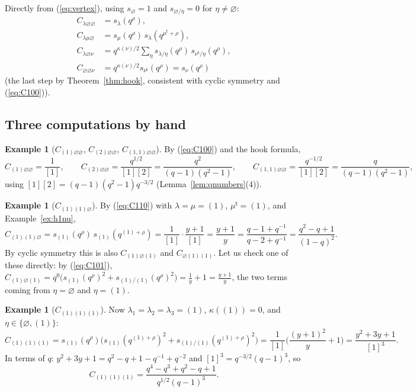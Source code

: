 \documentclass[11pt]{article}
\theoremstyle{plain}
\theoremstyle{definition}
\newtheorem{example}[theorem]{Example}
\theoremstyle{remark}
\newcommand{\qrho}{q^{\rho}}
\newcommand{\qlr}[1]{q^{#1+\rho}}
\newcommand{\es}{\varnothing}
\newcommand{\tr}{{\mathsf t}}
\newcommand{\lt}[1]{#1^{\tr}}
\begin{document}
Directly from (\ref{eq:vertex}), using $s_{\es}=1$ and $s_{\es/\eta}=0$ for $\eta\ne\es$:
\begin{align}
C_{\lambda\es\es}&=s_\lambda(\qrho),\label{eq:C100}\\
C_{\lambda\mu\es}&=s_\mu(\qrho)\,s_\lambda(q^{\lt\mu+\rho}),\label{eq:C110}\\
C_{\lambda\es\nu}&=q^{\kappa(\nu)/2}\sum_\eta s_{\lambda/\eta}(\qrho)\,s_{\lt\nu/\eta}(\qrho),\label{eq:C101}\\
C_{\es\es\nu}&=q^{\kappa(\nu)/2}s_{\lt\nu}(\qrho)=s_\nu(\qrho)\label{eq:C001}
\end{align}
(the last step by Theorem~\ref{thm:hook}, consistent with cyclic symmetry and (\ref{eq:C100})).

\subsection{Three computations by hand}

\begin{example}[$C_{(1)\es\es}$, $C_{(2)\es\es}$, $C_{(1,1)\es\es}$]
By (\ref{eq:C100}) and the hook formula,
\begin{equation}
C_{(1)\es\es}=\frac1{[1]},\qquad C_{(2)\es\es}=\frac{q^{1/2}}{[1][2]}=\frac{q^2}{(q-1)(q^2-1)},\qquad
C_{(1,1)\es\es}=\frac{q^{-1/2}}{[1][2]}=\frac{q}{(q-1)(q^2-1)},
\end{equation}
using $[1][2]=(q-1)(q^2-1)q^{-3/2}$ (Lemma~\ref{lem:qnumbers}(4)).
\end{example}

\begin{example}[$C_{(1)(1)\es}$]\label{ex:C110}
By (\ref{eq:C110}) with $\lambda=\mu=(1)$, $\lt\mu=(1)$, and Example~\ref{ex:h1nu},
\begin{equation}
C_{(1)(1)\es}=s_{(1)}(\qrho)\,s_{(1)}(\qlr{(1)})=\frac1{[1]}\cdot\frac{y+1}{[1]}=\frac{y+1}{y}
=\frac{q-1+q^{-1}}{q-2+q^{-1}}=\frac{q^2-q+1}{(1-q)^2}.
\end{equation}
By cyclic symmetry this is also $C_{(1)\es(1)}$ and $C_{\es(1)(1)}$. Let us check one of these
directly: by (\ref{eq:C101}), $C_{(1)\es(1)}=q^0\big(s_{(1)}(\qrho)^2+s_{(1)/(1)}(\qrho)^2\big)
=\frac1y+1=\frac{y+1}{y}$, the two terms coming from $\eta=\es$ and $\eta=(1)$. \checkmark
\end{example}

\begin{example}[$C_{(1)(1)(1)}$]\label{ex:C111}
Now $\lambda_1=\lambda_2=\lambda_3=(1)$, $\kappa((1))=0$, and $\eta\in\{\es,(1)\}$:
\begin{equation}
C_{(1)(1)(1)}=s_{(1)}(\qrho)\Big(s_{(1)}(\qlr{(1)})^2+s_{(1)/(1)}(\qlr{(1)})^2\Big)
=\frac1{[1]}\Big(\frac{(y+1)^2}{y}+1\Big)=\frac{y^2+3y+1}{[1]^3}.
\end{equation}
In terms of $q$: $y^2+3y+1=q^2-q+1-q^{-1}+q^{-2}$ and $[1]^3=q^{-3/2}(q-1)^3$, so
\begin{equation}
C_{(1)(1)(1)}=\frac{q^4-q^3+q^2-q+1}{q^{1/2}(q-1)^3}.
\end{equation}
\end{example}
\end{document}
